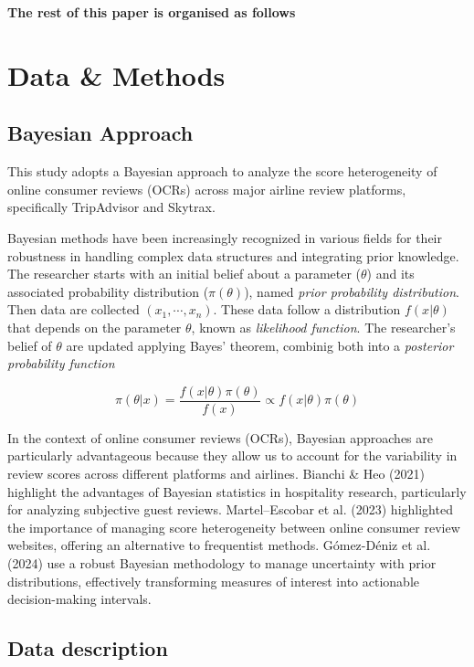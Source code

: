 \documentclass[
]{agujournal2019}
\begin{document}
\textbf{The rest of this paper is organised as follows}

\section{Data \& Methods}\label{sec-data-methods}

\subsection{Bayesian Approach}\label{bayesian-approach}

This study adopts a Bayesian approach to analyze the score heterogeneity
of online consumer reviews (OCRs) across major airline review platforms,
specifically TripAdvisor and Skytrax.

Bayesian methods have been increasingly recognized in various fields for
their robustness in handling complex data structures and integrating
prior knowledge. The researcher starts with an initial belief about a
parameter (\(\theta\)) and its associated probability distribution
(\(\pi(\theta)\)), named \emph{prior probability distribution}. Then
data are collected \((x_1,\cdots,x_n)\). These data follow a
distribution \(f(x\vert \theta)\) that depends on the parameter
\(\theta\), known as \emph{likelihood function}. The researcher's belief
of \(\theta\) are updated applying Bayes' theorem, combinig both into a
\emph{posterior probability function}

\[
\pi(\theta\vert x)=\frac{f(x\vert \theta)\pi(\theta)}{f(x)}\propto f(x\vert \theta)\pi(\theta)
\]

In the context of online consumer reviews (OCRs), Bayesian approaches
are particularly advantageous because they allow us to account for the
variability in review scores across different platforms and airlines.
Bianchi \& Heo (2021) highlight the advantages of Bayesian statistics in
hospitality research, particularly for analyzing subjective guest
reviews. Martel--Escobar et al. (2023) highlighted the importance of
managing score heterogeneity between online consumer review websites,
offering an alternative to frequentist methods. Gómez-Déniz et al.
(2024) use a robust Bayesian methodology to manage uncertainty with
prior distributions, effectively transforming measures of interest into
actionable decision-making intervals.

\subsection{Data description}\label{data-description}
\end{document}
